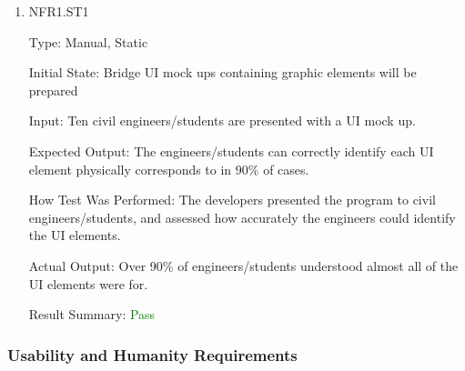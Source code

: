 \documentclass[12pt, titlepage]{article}
\begin{document}
\begin{enumerate}

\item{NFR1.ST1\\}

Type: Manual, Static

Initial State: Bridge UI mock ups containing graphic elements will be prepared

Input: Ten civil engineers/students are presented with a UI mock up.

Expected Output: The engineers/students can correctly identify each UI element physically corresponds to in 90\% of cases.

How Test Was Performed: The developers presented the program to civil engineers/students, and assessed how accurately the engineers could identify the UI elements.

Actual Output: Over 90\% of engineers/students understood almost all of the UI elements were for.

Result Summary: \textcolor{green} {Pass}

\end{enumerate}

\subsubsection{Usability and Humanity Requirements}
		
\end{document}
